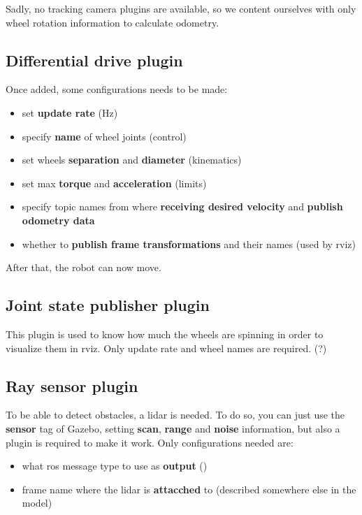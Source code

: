 Sadly, no tracking camera plugins are available, so we content ourselves with only wheel rotation information to calculate odometry. 

\subsection{Differential drive plugin}

Once added, some configurations needs to be made:
\begin{itemize}
    \item set \textbf{update rate} (Hz)
    \item specify \textbf{name} of wheel joints (control)
    \item set wheels \textbf{separation} and \textbf{diameter} (kinematics)
    \item set max \textbf{torque} and \textbf{acceleration} (limits)
    \item specify topic names from where \textbf{receiving desired velocity} and \textbf{publish odometry data}
    \item whether to \textbf{publish frame transformations} and their names (used by \acrshort{rviz})
\end{itemize}
After that, the robot can now move.

\subsection{Joint state publisher plugin} %

This plugin is used to know how much the wheels are spinning in order to visualize them in \acrshort{rviz}. Only update rate and wheel names are required. (?)

\subsection{Ray sensor plugin}

To be able to detect obstacles, a lidar is needed. To do so, you can just use the \textbf{sensor} tag  of Gazebo, setting \textbf{scan}, \textbf{range} and \textbf{noise} information, but also a plugin is required to make it work. Only configurations needed are:
\begin{itemize}
    \item what \acrshort{ros} message type to use as \textbf{output} ()
    \item frame name where the lidar is \textbf{attacched} to (described somewhere else in the model)
\end{itemize}


